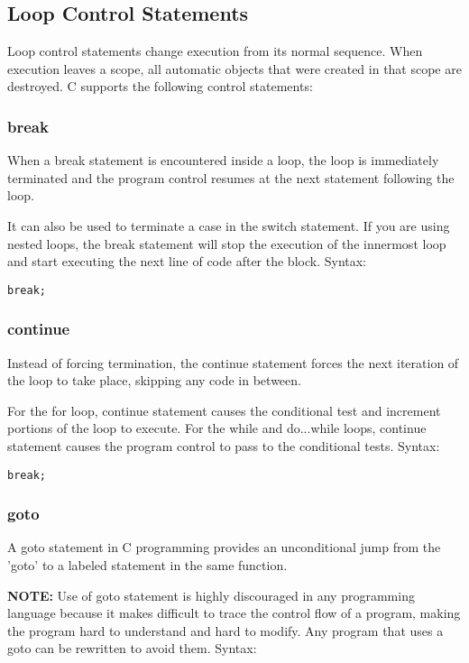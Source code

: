 \subsection{Loop Control Statements}
Loop control statements change execution from its normal sequence. When execution leaves a scope, all automatic objects that were created in that scope are destroyed. C supports the following control statements:

\subsubsection{break}
When a break statement is encountered inside a loop, the loop is immediately terminated and the program control resumes at the next statement following the loop.

\par It can also be used to terminate a case in the switch statement. If you are using nested loops, the break statement will stop the execution of the innermost loop and start executing the next line of code after the block. Syntax:

\begin{lstlisting}[style=CStyle]
   break;
\end{lstlisting}

\subsubsection{continue}
Instead of forcing termination, the continue statement forces the next iteration of the loop to take place, skipping any code in between.

For the for loop, continue statement causes the conditional test and increment portions of the loop to execute. For the while and do...while loops, continue statement causes the program control to pass to the conditional tests.
Syntax:

\begin{lstlisting}[style=CStyle]
   break;
\end{lstlisting}

\subsubsection{goto}
A goto statement in C programming provides an unconditional jump from the 'goto' to a labeled statement in the same function.

\par \textbf{NOTE:} Use of goto statement is highly discouraged in any programming language because it makes difficult to trace the control flow of a program, making the program hard to understand and hard to modify. Any program that uses a goto can be rewritten to avoid them. Syntax:

